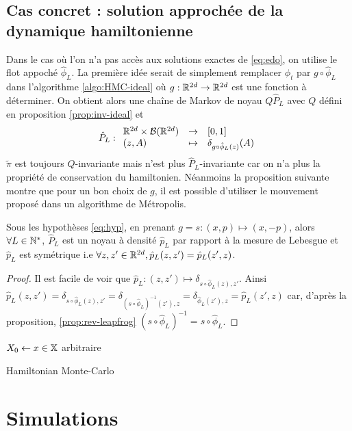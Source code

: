 \documentclass[10pt,a4paper]{article}
\begin{document}
\subsection{Cas concret : solution approchée de la dynamique hamiltonienne}
Dans le cas où l'on n'a pas accès aux solutions exactes de \eqref{eq:edo}, on utilise le flot appoché $\hat{\phi}_L$. La première idée serait de simplement remplacer $\phi_t$ par $g \circ \hat{\phi}_L$ dans l'algorithme \ref{algo:HMC-ideal} où $g : \mathbb{R}^{2d} \to \mathbb{R}^{2d}$ est une fonction à déterminer. On obtient alors une chaîne de Markov de noyau $Q\hat{P}_L$ avec $Q$ défini en proposition \ref{prop:inv-ideal} et
$$
\hat{P}_L : { \begin{array}{lcl} 
  \mathbb{R}^{2d} \times \mathcal{B}(\mathbb{R}^{2d}) & \to & [0,1] \\
  (z, A) & \mapsto & \delta_{g \circ \hat{\phi}_L(z)}(A)
 \end{array} }
$$
$\widetilde{\pi}$ est toujours $Q$-invariante mais n'est plus $\hat{P}_L$-invariante car on n'a plus la propriété de conservation du hamiltonien. Néanmoins la proposition suivante montre que pour un bon choix de $g$, il est possible d'utiliser le mouvement proposé dans un algorithme de Métropolis.

\begin{Prop}[symétrie]
  Sous les hypothèses \eqref{eq:hyp}, en prenant $g = s : (x, p) \mapsto (x,-p)$, alors $\forall L \in \mathbb{N}^*$, $\hat{P}_L$ est un noyau à densité $\hat{p}_L$ par rapport à la mesure de Lebesgue et $\hat{p}_L$ est symétrique i.e $\forall z,z' \in \mathbb{R}^{2d}, \hat{p}_L (z, z') = \hat{p}_L (z',z)$. 
\end{Prop}
\begin{proof}
  Il est facile de voir que $\hat{p}_L : (z,z') \mapsto \delta_{s \circ \hat{\phi}_L(z), z'}$. Ainsi $\hat{p}_L(z,z') =  \delta_{s \circ \hat{\phi}_L(z), z'} = \delta_{(s \circ \hat{\phi}_L)^{-1}(z'), z} = \delta_{\hat{\phi}_L(z'), z} = \hat{p}_L(z',z)$ car, d'après la proposition, \ref{prop:rev-leapfrog} $(s\circ \hat{\phi}_L)^{-1} = s \circ \hat{\phi}_L$. 
\end{proof}

\begin{center}
	\begin{algorithm}[H]
		$X_0 \leftarrow x \in \mathbb{X}$ arbitraire\;
		\caption{Hamiltonian Monte-Carlo}
		\label{algo:HMC}
	\end{algorithm}
\end{center}


\section{Simulations}



\pagebreak


\end{document}
